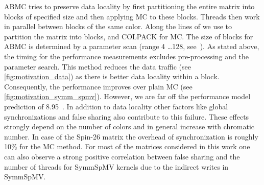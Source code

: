 \Acrfull{ABMC}\cite{ABMC} tries to preserve data locality by first partitioning
the entire matrix into blocks of specified size and then
applying \acrlong{MC} to these blocks. Threads then work in parallel
between blocks of the same color. Along the lines of \cite{Park_HPCG} 
we use \METIS \cite{METIS} to partition the matrix into blocks, and COLPACK 
for \acrlong{MC}. The size of blocks for \acrshort{ABMC} is
determined by a parameter scan (range 4 \ldots 128,
see~\cite{ABMC})\@. As stated above, the timing for the performance measurements
excludes pre-processing and the parameter search. This method reduces the 
data traffic (see \cref{fig:motivation_data}) as there is better data
locality within a block. Consequently, the performance improves
over plain \acrshort{MC} (see \cref{fig:motivation_symm_spmv}). However,
we are far off the performance model prediction of 8.95~\GF. In
addition to data locality other factors like global synchronizations
and false sharing also contribute to this failure. These
effects strongly depend on the number of colors and in general
increase with chromatic number. In case of the Spin-26 matrix the overhead of
synchronization is roughly 10\% for the \acrshort{MC} method.  For most of
the matrices considered in this work one can also observe a strong
positive correlation between false sharing and the number of threads
for \acrshort{SymmSpMV} kernels due to the indirect writes
in \acrshort{SymmSpMV}.
 
 



